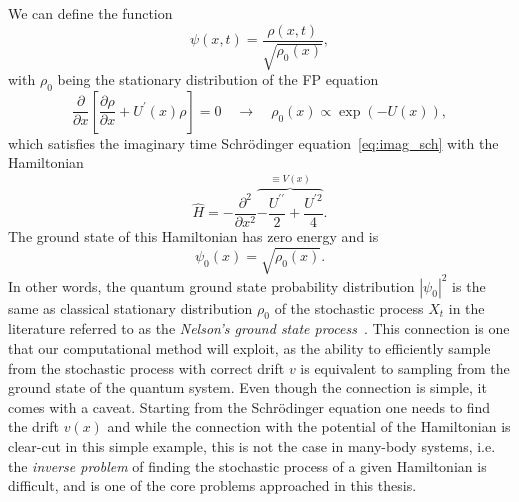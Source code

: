 We can define the function 
\begin{equation}
\psi(x, t)=\frac{\rho(x, t)}{\sqrt{\rho_{0}(x)}},
\end{equation}
with $\rho_{0}$ being the stationary distribution of the FP equation
\begin{equation}
\frac{\partial}{\partial x}\left[\frac{\partial \rho}{\partial x}+U^{\prime}(x) \rho\right] = 0 \quad \rightarrow \quad \rho_{0}(x) \propto \exp (-U(x)),
\end{equation}
which satisfies the imaginary time Schr\" odinger equation~\eqref{eq:imag_sch} with the Hamiltonian
\begin{equation}
\hat H=-\frac{\partial^{2}}{\partial x^{2}} \overbrace{-\frac{U^{\prime \prime}}{2}+\frac{U^{\prime 2}}{4}}^{\equiv V(x)}.
\end{equation}
The ground state of this Hamiltonian has zero energy and is 
\begin{equation}
\psi_{0}(x)=\sqrt{\rho_{0}(x)}.
\end{equation}
In other words, the quantum ground state probability distribution $|\psi_{0}|^2$ is the same as classical stationary distribution $\rho_{0}$ of the stochastic process $X_{t}$ in the literature referred to as the \emph{Nelson's ground state process}~\cite{nelson1967dynamical, albeverio1977energy}. This connection is one that our computational method will exploit, as the ability to efficiently sample from the stochastic process with correct drift $v$ is equivalent to sampling from the ground state of the quantum system. Even though the connection is simple, it comes with a caveat. Starting from the Schr\" odinger equation one needs to find the drift $v(x)$ and while the connection with the potential of the Hamiltonian is clear-cut in this simple example, this is not the case in many-body systems, i.e. the \emph{inverse problem} of finding the stochastic process of a given Hamiltonian is difficult, and is one of the core problems approached in this thesis.


